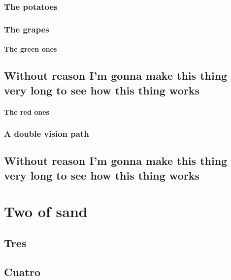 \documentclass[draft]{qx-files/qx-book}
\begin{document}
\section{The potatoes}

\lipsum[1-2]



\lipsum[1]

\ExerciseSection

\section{The grapes}

\lipsum[1]

\subsection{The green ones}

\lipsum[1]

\chapter*{Without reason I'm gonna make this thing very long to see how this thing works}

\subsection{The red ones}

\lipsum[1-2]

\section{A double vision path}

\lipsum

\chapter[Título largo]{Without reason I'm gonna make this thing very long to see how this thing works}
\lipsum


\part{Two of sand}

\chapter{Tres}
\lipsum


\chapter{Cuatro}
\lipsum[1]
\end{document}
